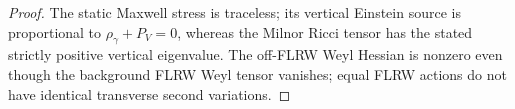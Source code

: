 \documentclass[12pt,a4paper]{article}
\begin{document}
\begin{proof}
The static Maxwell stress is traceless; its vertical Einstein
source is proportional to $\rho_\gamma+P_V=0$, whereas the Milnor
Ricci tensor has the stated strictly positive vertical eigenvalue.
The off-FLRW Weyl Hessian is nonzero even though the background FLRW
Weyl tensor vanishes; equal FLRW actions do not have identical
transverse second variations.
\end{proof}
\end{document}
